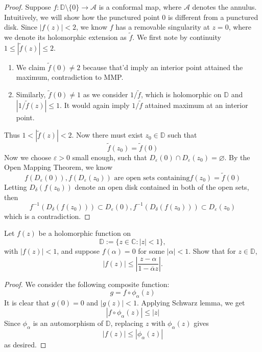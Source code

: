 \documentclass[openany]{book}
\newcommand{\D}{\mathbb{D}}
\begin{document}
\begin{proof}
    Suppose $f:\D\setminus\{0\}\to\mathcal{A}$ is a conformal map, where $\mathcal{A}$ denotes the annulus. Intuitively, we will show how the punctured point $0$ is different from a punctured disk. Since $|f(z)|<2$, we know $f$ has a removable singularity at $z=0$, where we denote its holomorphic extension as $\tilde{f}$. We first note by continuity $1\leq|\tilde{f}(z)|\leq 2$.
    \begin{enumerate}
        \item We claim $\tilde{f}(0)\neq 2$ because that'd imply an interior point attained the maximum, contradiction to MMP.
        \item Similarly, $\tilde{f}(0)\neq 1$ as we consider $1/\tilde{f}$, which is holomorphic on $\D$ and $|1/\tilde{f}(z)|\leq 1$. It would again imply $1/\tilde{f}$ attained maximum at an interior point.
    \end{enumerate}
    Thus $1<|\tilde{f}(z)|<2$. Now there must exist $z_0\in\D$ such that 
    \begin{equation*}
        \tilde{f}(z_0)=\tilde{f}(0)
    \end{equation*}
    Now we choose $\varepsilon>0$ small enough, such that $D_\varepsilon(0)\cap D_\varepsilon(z_0)=\varnothing$. By the Open Mapping Theorem, we know 
    \begin{equation*}
        f(D_\varepsilon(0)), f(D_\varepsilon(z_0)) \text{ are open sets containing} f(z_0)=\tilde{f}(0) 
    \end{equation*}
    Letting $D_\delta(f(z_0))$ denote an open disk contained in both of the open sets, then 
    \begin{equation*}
        f^{-1}(D_\delta(f(z_0)))\subset D_\varepsilon(0), f^{-1}(D_\delta(f(z_0)))\subset D_\varepsilon(z_0)
    \end{equation*}
    which is a contradiction.
\end{proof}


\begin{prob}[Fall 2019, Q4]
Let $f(z)$ be a holomorphic function on
\[
\D:=\{z\in\mathbb{C}:|z|<1\},
\]
with $|f(z)|<1$, and suppose $f(\alpha)=0$ for some $|\alpha|<1$.
Show that for $z\in\D$,
\[
|f(z)|\leq \left|\frac{z-\alpha}{1-\overline{\alpha}z}\right|.
\]
\end{prob}

\begin{proof}
    We consider the following composite function:
    \begin{equation*}
        g=f\circ\phi_\alpha(z)
    \end{equation*}
    It is clear that $g(0)=0$ and $|g(z)|<1$. Applying Schwarz lemma, we get 
    \begin{equation*}
        |f\circ\phi_\alpha(z)|\leq|z|
    \end{equation*}
    Since $\phi_\alpha$ is an automorphism of $\D$, replacing $z$ with $\phi_\alpha(z)$ gives
    \begin{equation*}
        |f(z)|\leq|\phi_\alpha(z)|
    \end{equation*}
    as desired.
\end{proof}
\end{document}
